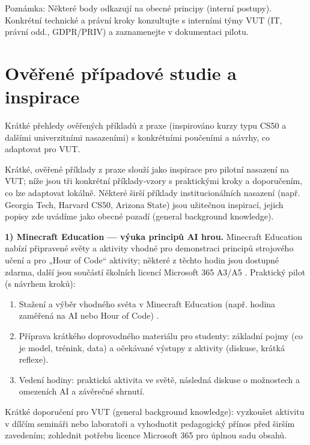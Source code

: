 \documentclass{report}%
\begin{document}
Poznámka: Některé body odkazují na obecné principy (interní postupy). Konkrétní technické a právní kroky konzultujte s interními týmy VUT (IT, právní odd., GDPR/PRIV) a zaznamenejte v dokumentaci pilotu.%

%
\section{Ověřené případové studie a inspirace}%
Krátké přehledy ověřených příkladů z praxe (inspirováno kurzy typu CS50 a dalšími univerzitními nasazeními) s konkrétními poučeními a návrhy, co adaptovat pro VUT.%


%
Krátké, ověřené příklady z praxe slouží jako inspirace pro pilotní nasazení na VUT; níže jsou tři konkrétní příklady‑vzory s praktickými kroky a doporučením, co lze adaptovat lokálně. Některé širší příklady institucionálních nasazení (např. Georgia Tech, Harvard CS50, Arizona State) jsou užitečnou inspirací, jejich popisy zde uvádíme jako obecné pozadí (general background knowledge).

\medskip

\textbf{1) Minecraft Education — výuka principů AI hrou.}  
Minecraft Education nabízí připravené světy a aktivity vhodné pro demonstraci principů strojového učení a pro „Hour of Code“ aktivity; některé z těchto hodin jsou dostupné zdarma, další jsou součástí školních licencí Microsoft 365 A3/A5 \cite{kb_ai_101_tipu_pdf_04e4a115_page_15_2}.  
Praktický pilot (s návrhem kroků):
\begin{enumerate}
  \item Stažení a výběr vhodného světa v Minecraft Education (např. hodina zaměřená na AI nebo Hour of Code) \cite{kb_ai_101_tipu_pdf_04e4a115_page_15_2}.
  \item Příprava krátkého doprovodného materiálu pro studenty: základní pojmy (co je model, trénink, data) a očekávané výstupy z aktivity (diskuse, krátká reflexe).
  \item Vedení hodiny: praktická aktivita ve světě, následná diskuse o možnostech a omezeních AI a závěrečné shrnutí.
\end{enumerate}
Krátké doporučení pro VUT (general background knowledge): vyzkoušet aktivitu v dílčím semináři nebo laboratoři a vyhodnotit pedagogický přínos před širším zavedením; zohlednit potřebu licence Microsoft 365 pro úplnou sadu obsahů.

\medskip
\end{document}
